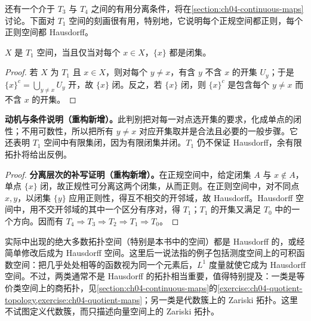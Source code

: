 \documentclass[../../main.tex]{subfiles}%
\begin{document}
还有一个介于 $T_3$ 与 $T_4$ 之间的有用分离条件，将在\cref{section:ch04-continuous-maps}讨论。下面对 $T_1$ 空间的刻画很有用，特别地，它说明每个正规空间都正则，每个正则空间都 Hausdorff。
\begin{proposition}\label{proposition:ch04-t1-singletons}
$X$ 是 $T_1$ 空间，当且仅当对每个 $x\in X$，$\{x\}$ 都是闭集。
\end{proposition}
\begin{proof}
若 $X$ 为 $T_1$ 且 $x\in X$，则对每个 $y\ne x$，有含 $y$ 不含 $x$ 的开集 $U_y$；于是 $\{x\}^c=\bigcup_{y\ne x}U_y$ 开，故 $\{x\}$ 闭。反之，若 $\{x\}$ 闭，则 $\{x\}^c$ 是包含每个 $y\ne x$ 而不含 $x$ 的开集。
\end{proof}
\begin{remark}
\textbf{动机与条件说明（重构新增）。}此判别把对每一对点选开集的要求，化成单点的闭性；不用可数性，所以把所有 $y\ne x$ 对应开集取并是合法且必要的一般步骤。它还表明 $T_1$ 空间中有限集闭，因为有限闭集并闭。$T_1$ 仍不保证 Hausdorff，余有限拓扑将给出反例。
\end{remark}
\begin{proof}
\textbf{分离层次的补写证明（重构新增）。}在正规空间中，给定闭集 $A$ 与 $x\notin A$，单点 $\{x\}$ 闭，故正规性可分离这两个闭集，从而正则。在正则空间中，对不同点 $x,y$，以闭集 $\{y\}$ 应用正则性，得互不相交的开邻域，故 Hausdorff。Hausdorff 空间中，用不交开邻域的其中一个区分有序对，得 $T_1$；$T_1$ 的开集又满足 $T_0$ 中的一个方向。因而有 $T_4\Rightarrow T_3\Rightarrow T_2\Rightarrow T_1\Rightarrow T_0$。
\end{proof}
实际中出现的绝大多数拓扑空间（特别是本书中的空间）都是 Hausdorff 的，或经简单修改后成为 Hausdorff 空间。这里后一说法指的例子包括测度空间上的可积函数空间：把几乎处处相等的函数视为同一个元素后，$L^1$ 度量就使它成为 Hausdorff 空间。不过，两类通常不是 Hausdorff 的拓扑相当重要，值得特别提及：一类是等价类空间上的商拓扑，见\cref{section:ch04-continuous-maps}的\cref{exercise:ch04-quotient-topology,exercise:ch04-quotient-maps}；另一类是代数簇上的 Zariski 拓扑。这里不试图定义代数簇，而只描述向量空间上的 Zariski 拓扑。
\end{document}
